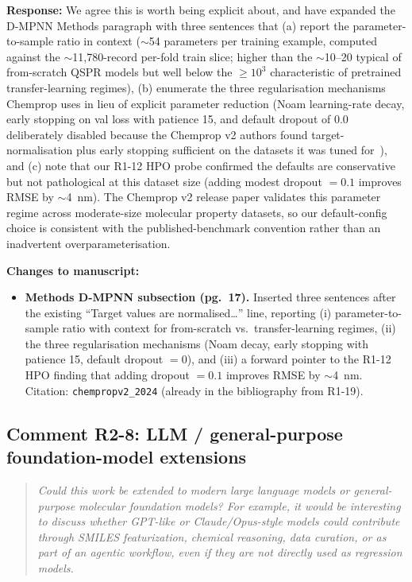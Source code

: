 \documentclass[11pt]{article}
\newenvironment{reviewer}{%
  \begin{quote}\itshape\color{black!70}}{%
  \end{quote}}
\newcommand{\response}[1]{\noindent\textbf{Response:} #1\par\medskip}
\newenvironment{changes}{%
  \noindent\textbf{Changes to manuscript:}
  \begin{itemize}[leftmargin=2em,itemsep=2pt]}{%
  \end{itemize}\medskip}
\begin{document}
\response{We agree this is worth being explicit about, and have expanded the D-MPNN Methods paragraph with three sentences that (a) report the parameter-to-sample ratio in context ($\sim$54 parameters per training example, computed against the $\sim$11{,}780-record per-fold train slice; higher than the $\sim$10--20 typical of from-scratch QSPR models but well below the $\geq 10^3$ characteristic of pretrained transfer-learning regimes), (b) enumerate the three regularisation mechanisms Chemprop uses in lieu of explicit parameter reduction (Noam learning-rate decay, early stopping on val loss with patience 15, and default dropout of 0.0 deliberately disabled because the Chemprop v2 authors found target-normalisation plus early stopping sufficient on the datasets it was tuned for~\cite{chempropv2_2024}), and (c) note that our R1-12 HPO probe confirmed the defaults are conservative but not pathological at this dataset size (adding modest dropout $= 0.1$ improves RMSE by $\sim$4~nm). The Chemprop v2 release paper validates this parameter regime across moderate-size molecular property datasets, so our default-config choice is consistent with the published-benchmark convention rather than an inadvertent overparameterisation.}

\begin{changes}
  \item \textbf{Methods D-MPNN subsection (pg.\ 17).} Inserted three sentences after the existing ``Target values are normalised\ldots'' line, reporting (i) parameter-to-sample ratio with context for from-scratch vs.\ transfer-learning regimes, (ii) the three regularisation mechanisms (Noam decay, early stopping with patience 15, default dropout $= 0$), and (iii) a forward pointer to the R1-12 HPO finding that adding dropout $= 0.1$ improves RMSE by $\sim$4~nm. Citation: \texttt{chempropv2\_2024} (already in the bibliography from R1-19).
\end{changes}

\subsection*{Comment R2-8: LLM / general-purpose foundation-model extensions}
\begin{reviewer}
Could this work be extended to modern large language models or general-purpose molecular foundation models? For example, it would be interesting to discuss whether GPT-like or Claude/Opus-style models could contribute through SMILES featurization, chemical reasoning, data curation, or as part of an agentic workflow, even if they are not directly used as regression models.
\end{reviewer}
\end{document}
